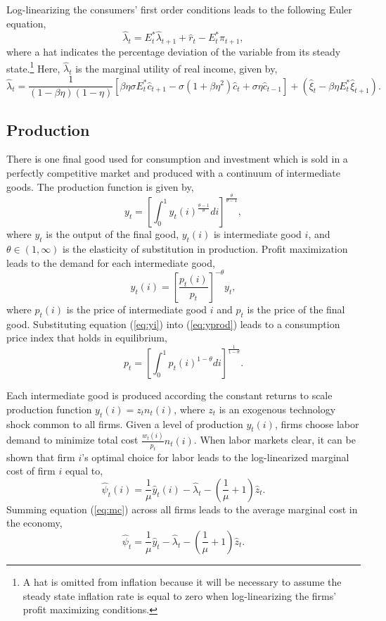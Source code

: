 \documentclass[12pt]{article}
\newcommand{\beq}{\begin{equation}}
\newcommand{\eeq}{\end{equation}}
\newcommand{\h}[1]{\hat{#1}}
\begin{document}
Log-linearizing the consumers' first order conditions leads to the following Euler equation,
\beq \label{eq:lneuler} \h{\lambda}_{t} = E_t^* \h{\lambda}_{t+1} + \h{r}_t - E_t^* \pi_{t+1}, \eeq
where a hat indicates the percentage deviation of the variable from its steady state.\footnote{A hat is omitted from inflation because it will be necessary to assume the steady state inflation rate is equal to zero when log-linearizing the firms' profit maximizing conditions.}  Here, $\h{\lambda}_t$ is the marginal utility of real income, given by,
\beq \label{eq:lnlambda} \h{\lambda}_t = \frac{1}{ (1-\beta \eta)(1-\eta)}\left[ \beta \eta \sigma E_t^* \h{c}_{t+1} - \sigma(1+\beta \eta^2) \h{c}_t + \sigma \eta \h{c}_{t-1} \right] + \left(\h{\xi}_t - \beta \eta E_t^* \h{\xi}_{t+1} \right). \eeq

\subsection{Production}
There is one final good used for consumption and investment which is sold in a perfectly competitive market and produced with a continuum of intermediate goods.  The production function is given by,
\beq \label{eq:yprod} y_t = \left[ \int_0^1 y_t(i)^{\frac{\theta-1}{\theta}} di \right]^{\frac{\theta}{\theta-1}}, \eeq
where $y_t$ is the output of the final good, $y_t(i)$ is intermediate good $i$, and $\theta \in (1,\infty)$ is the elasticity of substitution in production.  Profit maximization leads to the demand for each intermediate good,
\beq \label{eq:yi} y_t(i) = \left[ \frac{p_t(i)}{p_t} \right]^{-\theta} y_t, \eeq
where $p_t(i)$ is the price of intermediate good $i$ and $p_t$ is the price of the final good.  Substituting equation (\ref{eq:yi}) into (\ref{eq:yprod}) leads to a consumption price index that holds in equilibrium,
\beq \label{eq:pfinal} p_t = \left[ \int_0^1 p_t(i)^{1-\theta} di \right]^{\frac{1}{1-\theta}}. \eeq

Each intermediate good is produced according the constant returns to scale production function $y_t(i) = z_t n_t(i)$, where $z_t$ is an exogenous technology shock common to all firms.  Given a level of production $y_t(i)$, firms choose labor demand to minimize total cost $\frac{w_t(i)}{p_t}n_t(i)$.  When labor markets clear, it can be shown that firm $i$'s optimal choice for labor leads to the log-linearized marginal cost of firm $i$ equal to,
\beq \label{eq:mc} \h{\psi}_t(i) = \frac{1}{\mu} \h{y}_t(i) - \h{\lambda}_t - \left(\frac{1}{\mu} + 1\right) \h{z}_t. \eeq
Summing equation (\ref{eq:mc}) across all firms leads to the average marginal cost in the economy,
\beq \label{eq:mc2} \h{\psi}_t = \frac{1}{\mu} \h{y}_t - \h{\lambda}_t - \left(\frac{1}{\mu} + 1\right) \h{z}_t. \eeq
\end{document}
